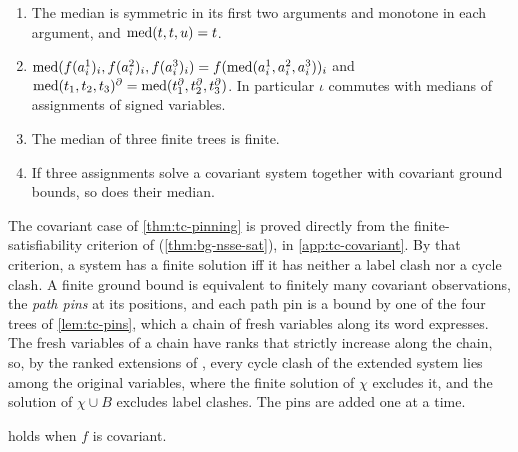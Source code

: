 \begin{lemma}[Median]\label{lem:tc-median}
\leavevmode
\begin{enumerate}[leftmargin=*]
\item The median is symmetric in its first two arguments and monotone in each
  argument, and $\operatorname{med}(t,t,u)=t$.
\item $\operatorname{med}(f(a^1_i)_i,f(a^2_i)_i,f(a^3_i)_i)=f(\operatorname{med}(a^1_i,a^2_i,a^3_i))_i$
  and $\operatorname{med}(t_1,t_2,t_3)^\partial=\operatorname{med}(t_1^\partial,t_2^\partial,t_3^\partial)$.
  In particular $\iota$ commutes with medians of assignments of signed
  variables.
\item The median of three finite trees is finite.
\item If three assignments solve a covariant system together with covariant
  ground bounds, so does their median.
\end{enumerate}
\end{lemma}

The covariant case of \cref{thm:tc-pinning} is proved directly from the
finite-satisfiability criterion of \citet{Zhao26}
(\cref{thm:bg-nsse-sat}), in \cref{app:tc-covariant}. By that
criterion, a system has a finite solution iff it has neither a label clash nor
a cycle clash. A finite ground bound is equivalent to finitely many covariant
observations, the \emph{path pins} at its positions, and each path pin is a
bound by one of the four trees of \cref{lem:tc-pins}, which a chain of fresh
variables along its word expresses. The fresh variables of a chain have ranks
that strictly increase along the chain, so, by the ranked extensions of
\citet{Zhao26}, every cycle clash of the extended system lies among the
original variables, where the finite solution of $\chi$ excludes it, and the
solution of $\chi\cup B$ excludes label clashes. The pins are added one at a
time.

\begin{lemma}\label{lem:tc-pinning-covariant}
 holds when $f$ is covariant.
\end{lemma}

